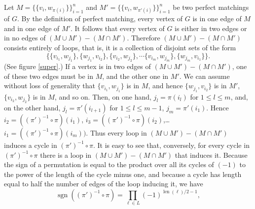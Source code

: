 \documentclass[10pt,reqno]{amsart}
\theoremstyle{plain}
\theoremstyle{definition}
\theoremstyle{remark}
\DeclareMathOperator{\sgn }{sgn }
\DeclareMathOperator{\len }{len }
\begin{document}
Let $M = \{\{v_i,w_{\pi(i)}\}\}_{i=1}^n$ and 
$M\prime = \{\{v_i,w_{\pi \prime (i)}\}\}_{i=1}^n$
be two perfect matchings of $G$. By the definition of perfect matching,
every vertex of $G$ is in one edge of $M$ and in one edge of $M\prime $.
It follows that every vertex of $G$ is either in two edges or in no edges
of $(M\cup M\prime)-(M\cap M\prime)$. Therefore 
 $(M\cup M\prime)-(M\cap M\prime)$ consists entirely of loops, that is,
it is a collection of disjoint sets of the form
\begin{equation}\{\{ v_{i_1},w_{j_1}\} ,\{w_{j_1},v_{i_2}\},\{ v_{i_2},w_{j_2}\}, \dotsb
    \{ v_{i_m},w_{j_m}\}, \{w_{j_m},v_{i_1}\}\}.\end{equation}
(See figure \ref{super}.) If a vertex is in two edges of
$(M\cup M\prime)-(M\cap M\prime)$, one of these two edges must be in
$M$, and the other one in $M\prime $. We can assume without loss of generality
that $\{v_{i_1},w_{j_1}\}$ is in $M$, and hence
$\{w_{j_1},v_{i_2}\}$ is in $M\prime $, 
$\{v_{i_2},w_{j_2}\}$ is in $M$, and so on. Then, on one hand,
$j_l = \pi(i_l)$ for $1\leq l\leq m$, and, on the other hand,
$j_l = \pi\prime (i_{l+1})$ for $1\leq l\leq m-1$,
$j_m = \pi\prime (i_1)$. Hence $i_2 = ((\pi\prime)^{-1} \circ \pi)(i_1)$,
$i_3 = ((\pi\prime)^{-1} \circ \pi)(i_2)$,\dots 
$i_1 = ((\pi\prime)^{-1} \circ \pi)(i_m))$.
Thus every loop in $(M\cup M\prime)-(M\cap M\prime)$ induces a cycle in
$(\pi\prime)^{-1} \circ \pi$. It is easy to see that, conversely,
 for every cycle in
$(\pi\prime)^{-1} \circ \pi$ there is a loop in 
$(M\cup M\prime)-(M\cap M\prime)$ that induces it. Because the sign
of a permutation is equal to the product over all its cycles of
$(-1)$ to the power of the length of the cycle minus one, and because
a cycle has length equal to half the number of edges of the loop inducing
it, we have
\begin{equation}\sgn((\pi\prime)^{-1} \circ \pi) = \prod_{\ell\in L} (-1)^{\len(\ell)/2-1},\end{equation}
\end{document}
